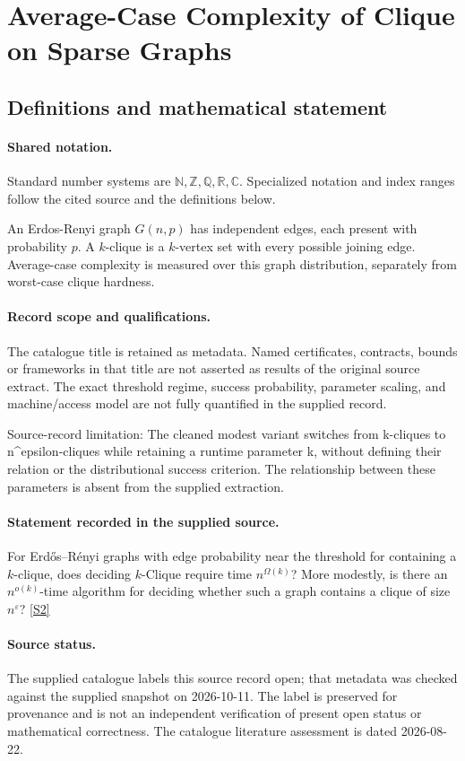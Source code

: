 \documentclass[11pt]{article}
\newcommand{\sref}[2]{\hyperlink{source:#1:#2}{[S#2]}}
\begin{document}
\section{Average-Case Complexity of Clique on Sparse Graphs}\label{statement}

\subsection{Definitions and mathematical statement}

\paragraph{Shared notation.}Standard number systems are $\mathbb N,\mathbb Z,\mathbb Q,\mathbb R,\mathbb C$. Specialized notation and index ranges follow the cited source and the definitions below.


An Erdos-Renyi graph $G(n,p)$ has independent edges, each present with probability $p$. A $k$-clique is a $k$-vertex set with every possible joining edge. Average-case complexity is measured over this graph distribution, separately from worst-case clique hardness.
\paragraph{Record scope and qualifications.}
The catalogue title is retained as metadata. Named certificates, contracts, bounds or frameworks in that title are not asserted as results of the original source extract.
The exact threshold regime, success probability, parameter scaling, and machine/access model are not fully quantified in the supplied record.

Source-record limitation: The cleaned modest variant switches from k-cliques to n^epsilon-cliques while retaining a runtime parameter k, without defining their relation or the distributional success criterion. The relationship between these parameters is absent from the supplied extraction.
\paragraph{Statement recorded in the supplied source.}
For Erdős–Rényi graphs with edge probability near the threshold for containing a $k$-clique, does deciding $k$-Clique require time $n^{\Omega(k)}$? More modestly, is there an $n^{o(k)}$-time algorithm for deciding whether such a graph contains a clique of size $n^\varepsilon$? \sref{statement}{2}
\paragraph{Source status.}
The supplied catalogue labels this source record open; that metadata was checked against the supplied snapshot on 2026-10-11. The label is preserved for provenance and is not an independent verification of present open status or mathematical correctness. The catalogue literature assessment is dated 2026-08-22.
\end{document}
